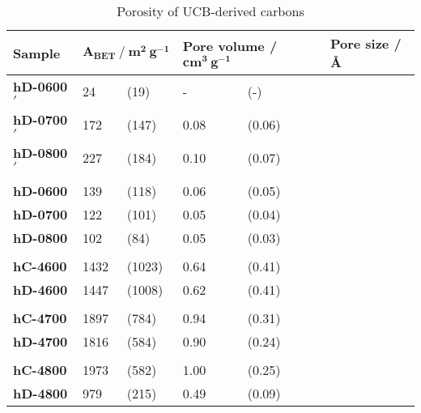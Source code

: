 \begin{table}[ht]
    \caption{Porosity of UCB-derived carbons}
    \label{tb:cb_porosity}
    \begin{tabularx}{\textwidth}{lllllll}
    \toprule
        \textbf{Sample} & \multicolumn{2}{l}{$\mathbf{A_{BET}\ /\ m^2\ g^{-1}}$}  & \multicolumn{2}{l}{\textbf{Pore volume} / $\mathbf{cm^3\ g^{-1}}$} & \multicolumn{2}{l}{\textbf{Pore size / \AA}} \\
    \midrule
        \textbf{hD-0600$'$} & 24 & (19) & - & (-) & \\
        \textbf{hD-0700$'$} & 172 & (147) & 0.08 & (0.06) \\
        \textbf{hD-0800$'$} & 227 & (184) & 0.10 & (0.07) \\
        & & & \\
        \textbf{hD-0600} & 139 & (118) & 0.06 & (0.05) & \\
        \textbf{hD-0700} & 122 &  (101) & 0.05 & (0.04) & \\
        \textbf{hD-0800} & 102 & (84) & 0.05 & (0.03) \\
        & & & \\
        \textbf{hC-4600} & 1432 & (1023) & 0.64 & (0.41) &  \\
        \textbf{hD-4600} & 1447 & (1008) & 0.62 & (0.41) & \\
        & & & \\
        \textbf{hC-4700} & 1897 & (784) & 0.94 & (0.31) & \\
        \textbf{hD-4700} & 1816 & (584) & 0.90 & (0.24) & \\
        & & & \\
        \textbf{hC-4800} & 1973 & (582) & 1.00 & (0.25) & \\
        \textbf{hD-4800} & 979 & (215) & 0.49 & (0.09) &  \\
    \bottomrule
    \end{tabularx}
\end{table}

